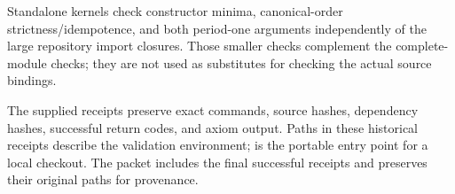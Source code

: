 Standalone kernels check constructor minima, canonical-order strictness/idempotence, and both period-one arguments independently of the large repository import closures. Those smaller checks complement the complete-module checks; they are not used as substitutes for checking the actual source bindings.

The supplied receipts preserve exact commands, source hashes, dependency hashes, successful return codes, and axiom output. Paths in these historical receipts describe the validation environment;  is the portable entry point for a local checkout. The packet includes the final successful receipts and preserves their original paths for provenance.
